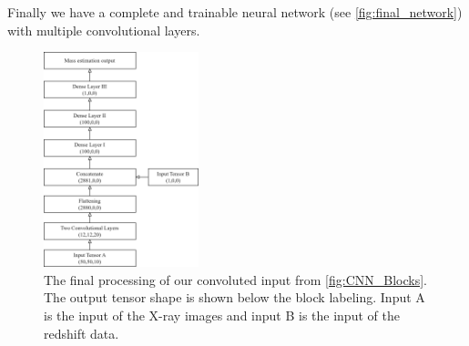 Finally we have a complete and trainable neural network (see \autoref{fig:final_network}) with multiple convolutional layers. 

\begin{figure}[H]
\centering
\includegraphics[width=0.4\textwidth]{images/Chapter2/basic.png}
\caption{The final processing of our convoluted input from \autoref{fig:CNN_Blocks}. The output tensor shape is shown below the block labeling. Input A is the input of the X-ray images and input B is the input of the redshift data.} 
\label{fig:final_network}
\end{figure}










